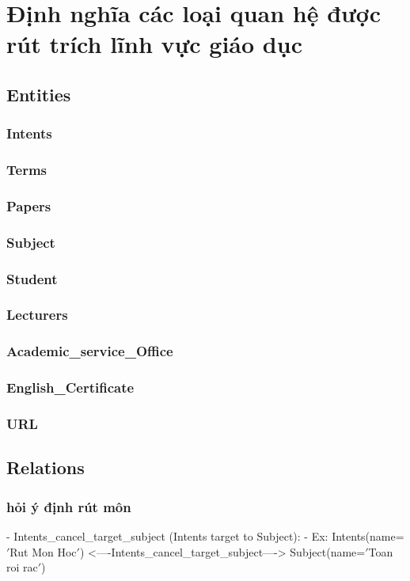 \section{Định nghĩa các loại quan hệ được rút trích lĩnh vực giáo dục}\label{sec:inh-nghia-cac-loai-quan-he-uoc-rut-trich-linh-vuc-giao-duc}
\subsection{Entities}\label{subsec:entities}
\subsubsection{Intents}
\subsubsection{Terms}
\subsubsection{Papers}
\subsubsection{Subject}
\subsubsection{Student}
\subsubsection{Lecturers}
\subsubsection{Academic\_service\_Office}
\subsubsection{English\_Certificate}
\subsubsection{URL}

\subsection{Relations}\label{subsec:relations}
            \subsubsection{hỏi ý định rút môn}
            - Intents\_cancel\_target\_subject (Intents target to Subject):
                - Ex: Intents(name=\('\)Rut Mon Hoc\('\)) <----Intents\_cancel\_target\_subject----> Subject(name=\('\)Toan roi rac\('\))

